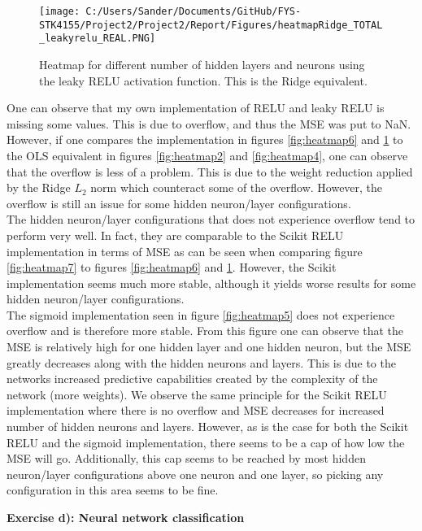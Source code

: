 \documentclass[12pt,a4paper]{article}
\begin{document}
\begin{figure}[H]
\centering
\texttt{[image: C:/Users/Sander/Documents/GitHub/FYS-STK4155/Project2/Project2/Report/Figures/heatmapRidge\_TOTAL\_leakyrelu\_REAL.PNG]}
\caption{\label{fig:heatmap8} Heatmap for different number of hidden layers and neurons using the leaky RELU activation function. This is the Ridge equivalent.}
\end{figure}

\noindent One can observe that my own implementation of RELU and leaky RELU is missing some values. This is due to overflow, and thus the MSE was put to NaN. However, if one compares the implementation in figures \ref{fig:heatmap6} and \ref{fig:heatmap8} to the OLS equivalent in figures \ref{fig:heatmap2} and \ref{fig:heatmap4}, one can observe that the overflow is less of a problem. This is due to the weight reduction applied by the Ridge $L_2$ norm which counteract some of the overflow. However, the overflow is still an issue for some hidden neuron/layer configurations. 
\\
The hidden neuron/layer configurations that does not experience overflow tend to perform very well. In fact, they are comparable to the Scikit RELU implementation in terms of MSE as can be seen when comparing figure \ref{fig:heatmap7} to figures \ref{fig:heatmap6} and \ref{fig:heatmap8}. However, the Scikit implementation seems much more stable, although it yields worse results for some hidden neuron/layer configurations.
\\
The sigmoid implementation seen in figure \ref{fig:heatmap5} does not experience overflow and is therefore more stable. From this figure one can observe that the MSE is relatively high for one hidden layer and one hidden neuron, but the MSE greatly decreases along with the hidden neurons and layers. This is due to the networks increased predictive capabilities created by the complexity of the network (more weights). We observe the same principle for the Scikit RELU implementation where there is no overflow and MSE decreases for increased number of hidden neurons and layers. However, as is the case for both the Scikit RELU and the sigmoid implementation, there seems to be a cap of how low the MSE will go. Additionally, this cap seems to be reached by most hidden neuron/layer configurations above one neuron and one layer, so picking any configuration in this area seems to be fine.

\newpage

\begin{center}
\Large{\textbf{Exercise d): Neural network classification}}
\end{center}
\end{document}
